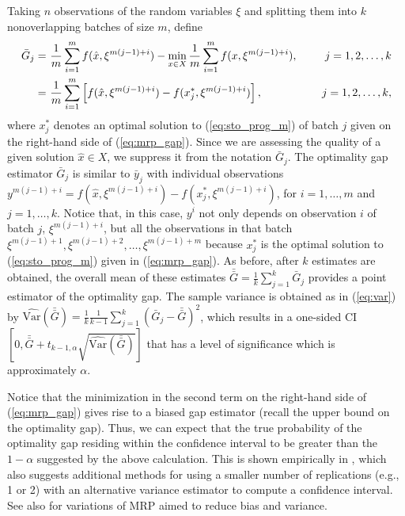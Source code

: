 \documentclass[12pt]{article}
\newcommand{\varh}[1]{\widehat{\mathrm{Var}} \left( #1 \right)}
\newcommand{\X}{X}
\newcommand{\x}{x}
\newcommand{\xh}{{\hat{\x}}}
\newcommand{\xs}{\x^*}
\newcommand{\xit}{\xi}
\newcommand{\gb}{\bar{G}}
\newcommand{\gbb}{\bar{\gb}}
\newcommand{\yb}{\bar{y}}
\begin{document}
Taking $n$ observations of the random variables $\xit$ and splitting them into $k$ nonoverlapping batches of size $m$, define 
\begin{align} 
	\gb_j =\  & \frac{1}{m} \sum_{i = 1}^{m} f(\xh, \xit^{m(j-1)+i}) - \min_{\x \in X} \frac{1}{m} \sum_{i=1}^{m} f(\x, \xit^{m(j-1)+i}),& \ \ \ \ j = 1,2, \dots, k \label{eq:mrp_gap}\\
         =\  & \frac{1}{m} \sum_{i = 1}^{m} \left[ f(\xh, \xit^{m(j-1)+i}) -  f(\xs_j, \xit^{m(j-1)+i}) \right],& \ \ \ \ j = 1,2, \dots, k, \notag
\end{align}
where $\xs_j$ denotes an optimal solution to (\ref{eq:sto_prog_m}) of batch $j$ given on the right-hand side of (\ref{eq:mrp_gap}).    
Since we are assessing the quality of a given solution $\xh \in \X$, we suppress it from the notation $\gb_j$.
The optimality gap estimator $\gb_j$ is similar to $\yb_j$ with individual observations $y^{m(j-1)+i} = f(\xh,\xit^{m(j-1)+i}) - f(\xs_j,\xit^{m(j-1)+i})$, for $i=1,\ldots,m$ and $j=1,\ldots, k$.
Notice that, in this case, $y^i$ not only depends on observation $i$ of batch $j$, $\xit^{m(j-1)+i}$, but all the observations in that batch $\xit^{m(j-1)+1},\xit^{m(j-1)+2},\ldots,\xit^{m(j-1)+m}$ because $\xs_j$ is the optimal solution to (\ref{eq:sto_prog_m}) given in (\ref{eq:mrp_gap}).   
As before, after $k$ estimates are obtained, the overall mean of these estimates $\gbb = \frac{1}{k} \sum_{j=1}^k \gb_j$ provides a point estimator of the optimality gap.  
The sample variance is obtained as in (\ref{eq:var}) by $\varh{\gbb} = \frac{1}{k} \frac{1}{k-1} \sum_{j=1}^k (\gb_j - \gbb)^2$, which results in a one-sided CI $\left[0, \gbb + t_{k-1,\alpha} \sqrt{\varh{\gbb}} \right]$ that has a level of significance which is approximately $\alpha$.

Notice that the minimization in the second term on the right-hand side of (\ref{eq:mrp_gap}) gives rise to a biased gap estimator (recall the upper bound on the optimality gap).  
Thus, we can expect that the true probability of the optimality gap residing within the confidence interval to be greater than the $1 - \alpha$ suggested by the above calculation.  
This is shown empirically in \citep{Bayraksan2006}, which also suggests additional methods for using a smaller number of replications (e.g., 1 or 2) with an alternative variance estimator to compute a confidence interval.  
See also \citep{bayraksan_morton_09,partani2006jackknife,partani_07} for variations of MRP aimed to reduce bias and variance.
\end{document}

